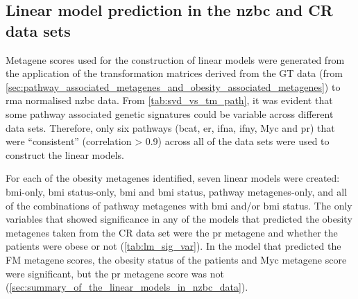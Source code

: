\subsection{Linear model prediction in the \gls{nzbc} and CR data sets}
\label{sub:linear_model_prediction_in_the_nzbc_and_cr_data_sets}

Metagene scores used for the construction of linear models were generated from the application of the transformation matrices derived from the GT data (from \cref{sec:pathway_associated_metagenes_and_obesity_associated_metagenes}) to \gls{rma} normalised \gls{nzbc} data.
From \cref{tab:svd_vs_tm_path}, it was evident that some pathway associated genetic signatures could be variable across different data sets.
Therefore, only six pathways (\gls{bcat}, \gls{er}, \gls{ifna}, \gls{ifny}, Myc and \gls{pr}) that were ``consistent'' (correlation \textgreater{} 0.9) across all of the data sets were used to construct the linear models.

For each of the obesity metagenes identified, seven linear models were created: \gls{bmi}-only, \gls{bmi} status-only, \gls{bmi} and \gls{bmi} status, pathway metagenes-only, and all of the combinations of pathway metagenes with \gls{bmi} and/or \gls{bmi} status.
The only variables that showed significance in any of the models that predicted the obesity metagenes taken from the CR data set were the \gls{pr} metagene and whether the patients were obese or not (\cref{tab:lm_sig_var}).
In the model that predicted the FM metagene scores, the obesity status of the patients and Myc metagene score were significant, but the \gls{pr} metagene score was not (\cref{sec:summary_of_the_linear_models_in_nzbc_data}).

